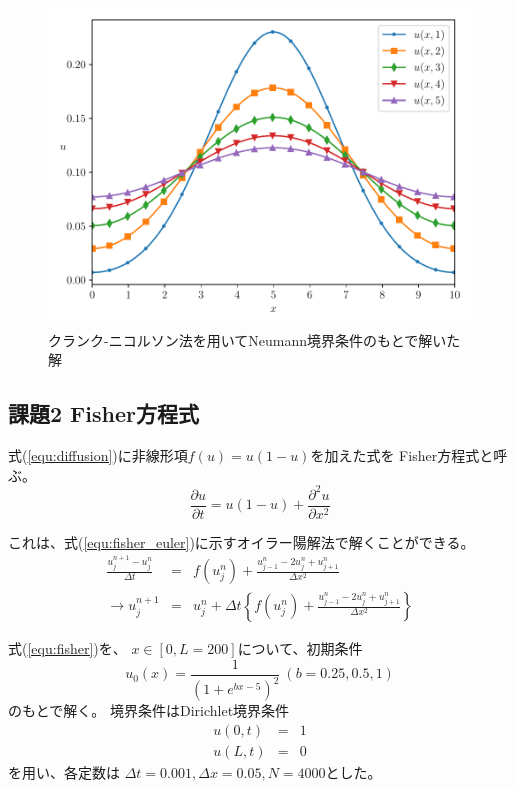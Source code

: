 \documentclass[a4j, titlepage]{jsarticle}
\numberwithin{equation}{section}
\begin{document}
            \begin{figure}[h]
                \centering
                \includegraphics[width=0.8\hsize]{kadai1/4.pdf}
                \caption{クランク-ニコルソン法を用いてNeumann境界条件のもとで解いた解}
                \label{fig:crank_neumann}
            \end{figure}

    \subsection{課題2 Fisher方程式}
        式(\ref{equ:diffusion})に非線形項$f(u) = u(1-u)$を加えた式を
        Fisher方程式と呼ぶ。
        \begin{equation}
            \frac{\partial u}{\partial t} = u(1 - u) + \frac{\partial^2u}{\partial x^2} \label{equ:fisher}
        \end{equation}

        これは、式(\ref{equ:fisher_euler})に示すオイラー陽解法で解くことができる。
        \begin{eqnarray}
            \frac{u_j^{n + 1} - u_j^n}{\Delta t} &=& f(u_j^n) + \frac{u_{j - 1}^n - 2u_j^n + u_{j + 1}^n}{\Delta x^2} \nonumber \\
            \rightarrow u_j^{n + 1} &=& u_j^n + \Delta t\left\{f(u_j^n) + \frac{u_{j - 1}^n - 2u_j^n + u_{j + 1}^n}{\Delta x^2} \label{equ:fisher_euler}\right\}
        \end{eqnarray}

        式(\ref{equ:fisher})を、
        $x\in[0, L = 200]$について、初期条件
        \begin{equation*}
            u_0(x) = \displaystyle\frac{1}{(1 + e^{bx - 5})^2} \ (b = 0.25, 0.5, 1)
        \end{equation*}
        のもとで解く。
        境界条件はDirichlet境界条件
        \begin{eqnarray*}
            u(0, t) &=& 1 \\
            u(L, t) &=& 0
        \end{eqnarray*}
        を用い、各定数は
        $\Delta t = 0.001, \Delta x = 0.05, N = 4000$とした。
\end{document}
